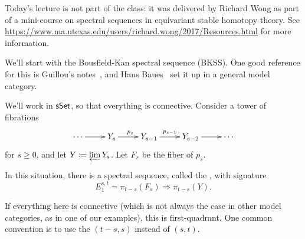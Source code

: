 Today's lecture is not part of the class: it was delivered by Richard Wong as part of a mini-course on spectral
sequences in equivariant stable homotopy theory. See
\url{https://www.ma.utexas.edu/users/richard.wong/2017/Resources.html} for more information.

We'll start with the Bousfield-Kan spectral sequence (BKSS). One good reference for this is Guillou's
notes~\cite{Guillou}, and Hans Baues~\cite{Baues} set it up in a general model category.

We'll work in $\mathsf{sSet}$, so that everything is connective. Consider a tower of fibrations
\begin{equation}
\label{fibtower}
\xymatrix{
	\dotsb\ar[r] & Y_s\ar[r]^{p_s} & Y_{s-1}\ar[r]^{p_{s-1}} &Y_{s-2}\ar[r] & \dotsb 
}
\end{equation}
for $s\ge 0$, and let $Y\coloneqq \varprojlim Y_s$. Let $F_s$ be the fiber of $p_s$.
\begin{thm}
In this situation, there is a spectral sequence, called the , with signature
\[E_1^{s,t} = \pi_{t-s}(F_s)\Longrightarrow \pi_{t-s}(Y).\]
\end{thm}
If everything here is connective (which is not always the case in other model categories, as in one of our
examples), this is first-quadrant. One common convention is to use the  $(t-s,s)$ instead of
$(s,t)$.

